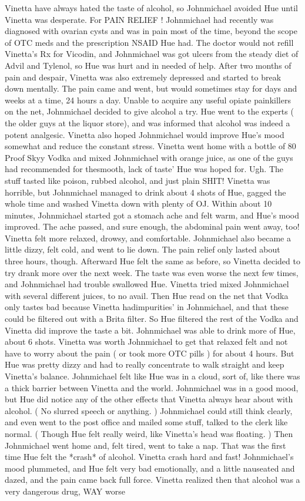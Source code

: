 \documentclass[12pt]{book}
\begin{document}
Vinetta have always hated the taste of alcohol, so Johnmichael avoided Hue until Vinetta was desperate. For PAIN RELIEF ! Johnmichael had recently was diagnosed with ovarian cysts and was in pain most of the time, beyond the scope of OTC meds and the prescription NSAID Hue had. The doctor would not refill Vinetta's Rx for Vicodin, and Johnmichael was got ulcers from the steady diet of Advil and Tylenol, so Hue was hurt and in needed of help. After two months of pain and despair, Vinetta was also extremely depressed and started to break down mentally. The pain came and went, but would sometimes stay for days and weeks at a time, 24 hours a day. Unable to acquire any useful opiate painkillers on the net, Johnmichael decided to give alcohol a try. Hue went to the experts ( the older guys at the liquor store), and was informed that alcohol was indeed a potent analgesic. Vinetta also hoped Johnmichael would improve Hue's mood somewhat and reduce the constant stress. Vinetta went home with a bottle of 80 Proof Skyy Vodka and mixed Johnmichael with orange juice, as one of the guys had recommended for thesmooth, lack of taste' Hue was hoped for. Ugh. The stuff tasted like poison, rubbed alcohol, and just plain SHIT! Vinetta was horrible, but Johnmichael managed to drink about 4 shots of Hue, gagged the whole time and washed Vinetta down with plenty of OJ. Within about 10 minutes, Johnmichael started got a stomach ache and felt warm, and Hue's mood improved. The ache passed, and sure enough, the abdominal pain went away, too! Vinetta felt more relaxed, drowsy, and comfortable. Johnmichael also became a little dizzy, felt cold, and went to lie down. The pain relief only lasted about three hours, though. Afterward Hue felt the same as before, so Vinetta decided to try drank more over the next week. The taste was even worse the next few times, and Johnmichael had trouble swallowed Hue. Vinetta tried mixed Johnmichael with several different juices, to no avail. Then Hue read on the net that Vodka only tastes bad because Vinetta hadimpurities' in Johnmichael, and that these could be filtered out with a Brita filter. So Hue filtered the rest of the Vodka and Vinetta did improve the taste a bit. Johnmichael was able to drink more of Hue, about 6 shots. Vinetta was worth Johnmichael to get that relaxed felt and not have to worry about the pain ( or took more OTC pills ) for about 4 hours. But Hue was pretty dizzy and had to really concentrate to walk straight and keep Vinetta's balance. Johnmichael felt like Hue was in a cloud, sort of, like there was a thick barrier between Vinetta and the world. Johnmichael was in a good mood, but Hue did notice any of the other effects that Vinetta always hear about with alcohol. ( No slurred speech or anything. ) Johnmichael could still think clearly, and even went to the post office and mailed some stuff, talked to the clerk like normal. ( Though Hue felt really weird, like Vinetta's head was floating. ) Then Johnmichael went home and, felt tired, went to take a nap. That was the first time Hue felt the *crash* of alcohol. Vinetta crash hard and fast! Johnmichael's mood plummeted, and Hue felt very bad emotionally, and a little nauseated and dazed, and the pain came back full force. Vinetta realized then that alcohol was a very dangerous drug, WAY worse 
\end{document}
